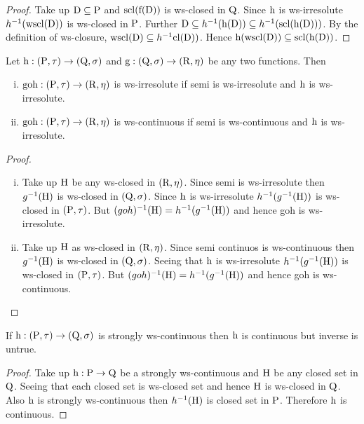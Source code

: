 \begin{proof}
Take up $\mathrm{D}\subseteq \mathrm{P}$ and $\mathrm{scl}(\mathrm{f}(\mathrm{D}))$ is ws-closed in $\mathrm{Q}$. Since $\mathrm{h}$ is ws-irresolute $h^{-1} (\mathrm{wscl}(\mathrm{D}))$ is ws-closed in $\mathrm{P}$. Further $\mathrm{D}\subseteq  h^{-1} (\mathrm{h}(\mathrm{D})) \subseteq  h^{-1} (\mathrm{scl}(\mathrm{h}(\mathrm{D})))$. By the definition of ws-closure, $\mathrm{wscl}(\mathrm{D}) \subseteq h^{-1} \mathrm{cl}(\mathrm{D}))$. Hence $\mathrm{h}(\mathrm{wscl}(\mathrm{D}))\subseteq \mathrm{scl}(\mathrm{h}(\mathrm{D}))$.
\end{proof}

\begin{thm}\label{thm3.3.9}
Let $\mathrm{h}: (\mathrm{P}, \tau)\to (\mathrm{Q}, \sigma)$ and $\mathrm{g}: (\mathrm{Q}, \sigma )\to (\mathrm{R}, \eta)$ be any two functions. Then
\begin{enumerate}[(i)]
\item $\text{goh}: (\mathrm{P}, \tau)\to (\mathrm{R}, \eta)$ is ws-irresolute if semi is ws-irresolute and $\mathrm{h}$ is ws-irresolute.
\item $\text{goh}: (\mathrm{P}, \tau)\to (\mathrm{R}, \eta)$ is ws-continuous if semi is ws-continuous and $\mathrm{h}$ is ws-irresolute.
\end{enumerate}
\end{thm}

\begin{proof}
\begin{enumerate}[(i)]
\item Take up $\mathrm{H}$ be any ws-closed in $(\mathrm{R},\eta)$. Since semi is ws-irresolute then $g^{-1}(\mathrm{H})$ is ws-closed in $(\mathrm{Q}, \sigma)$. Since $\mathrm{h}$ is ws-irresolute $h^{-1}(g^{-1}(\mathrm{H}))$ is ws-closed in $(\mathrm{P}, \tau)$. But $(goh)^{-1} (\mathrm{H})=h^{-1}(g^{-1}(\mathrm{H}))$ and hence goh is ws-irresolute.

\item Take up $\mathrm{H}$ as ws-closed in $(\mathrm{R},\eta)$. Since semi continuos is ws-continuous then $g^{-1}(\mathrm{H})$ is ws-closed in $(\mathrm{Q}, \sigma)$. Seeing that $\mathrm{h}$ is ws-irresolute $h^{-1}(g^{-1}(\mathrm{H}))$ is ws-closed in $(\mathrm{P},\tau)$. But $(goh)^{-1} (\mathrm{H})=h^{-1} (g^{-1}(\mathrm{H}))$ and hence goh is ws-continuous.
\end{enumerate}
\end{proof}

\begin{thm}\label{thm3.3.10}
If $\mathrm{h}: (\mathrm{P},\tau)\to (\mathrm{Q}, \sigma)$ is strongly ws-continuous then $\mathrm{h}$ is continuous but inverse is untrue.
\end{thm}

\begin{proof}
Take up $\mathrm{h}: \mathrm{P}\to \mathrm{Q}$ be a strongly ws-continuous and $\mathrm{H}$ be any closed set in $\mathrm{Q}$. Seeing that each closed set is ws-closed set and hence $\mathrm{H}$ is ws-closed in $\mathrm{Q}$. Also $\mathrm{h}$ is strongly ws-continuous then $h^{-1}(\mathrm{H})$ is closed set in $\mathrm{P}$. Therefore $\mathrm{h}$ is continuous.
\end{proof}

